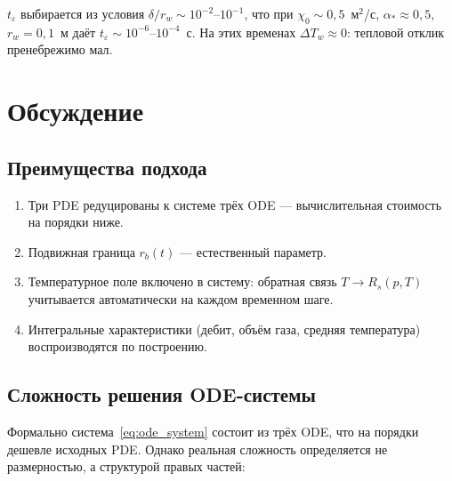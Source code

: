 \documentclass[12pt,a4paper]{article}
\begin{document}
$t_\varepsilon$ выбирается из условия $\delta/r_w \sim 10^{-2}\text{--}10^{-1}$,
что при $\chi_0 \sim 0{,}5$~м$^2$/с, $\alpha_* \approx 0{,}5$,
$r_w = 0{,}1$~м даёт $t_\varepsilon \sim 10^{-6}\text{--}10^{-4}$~с.
На этих временах $\Delta T_w \approx 0$: тепловой отклик пренебрежимо мал.


\section{Обсуждение}\label{sec:discussion}

\subsection{Преимущества подхода}

\begin{enumerate}[nosep]
  \item Три PDE редуцированы к системе трёх ODE ---
        вычислительная стоимость на порядки ниже.
  \item Подвижная граница $r_b(t)$ --- естественный параметр.
  \item Температурное поле включено в систему: обратная связь
        $T \to R_s(p,T)$ учитывается автоматически на каждом
        временном шаге.
  \item Интегральные характеристики (дебит, объём газа,
        средняя температура) воспроизводятся по построению.
\end{enumerate}

\subsection{Сложность решения ODE-системы}

Формально система~\eqref{eq:ode_system} состоит из трёх ODE,
что на порядки дешевле исходных PDE. Однако реальная сложность
определяется не размерностью, а структурой правых частей:
\end{document}
